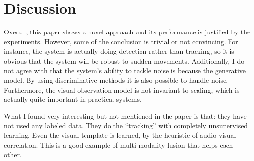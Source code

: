 \documentclass[11pt,a4paper]{article}
\begin{document}
\section{Discussion}

Overall, this paper shows a novel approach and its performance is justified by the experiments. However, some of the conclusion is trivial or not convincing. For instance, the system is actually doing detection rather than tracking, so it is obvious that the system will be robust to sudden movements. Additionally, I do not agree with that the system's ability to tackle noise is because the generative model. By using discriminative methods it is also possible to handle noise. Furthermore, the visual observation model is not invariant to scaling, which is actually quite important in practical systems.

What I found very interesting but not mentioned in the paper is that: they have not used any labeled data. They do the ``tracking'' with completely unsupervised learning. Even the visual template is learned, by the heuristic of audio-visual correlation. This is a good example of multi-modality fusion that helps each other.
\end{document}
